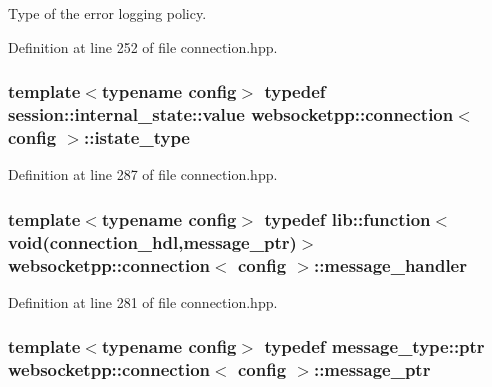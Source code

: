 Type of the error logging policy. 



Definition at line 252 of file connection.\+hpp.

\hypertarget{classwebsocketpp_1_1connection_ab22544fdc49d7f332cd1abba9fefd814}{}
\subsubsection[{istate\+\_\+type}]{\setlength{\rightskip}{0pt plus 5cm}template$<$typename config$>$ typedef {\bf session\+::internal\+\_\+state\+::value} {\bf websocketpp\+::connection}$<$ config $>$\+::{\bf istate\+\_\+type}}\label{classwebsocketpp_1_1connection_ab22544fdc49d7f332cd1abba9fefd814}


Definition at line 287 of file connection.\+hpp.

\hypertarget{classwebsocketpp_1_1connection_a0091551000546d5f5f427379d852cae9}{}
\subsubsection[{message\+\_\+handler}]{\setlength{\rightskip}{0pt plus 5cm}template$<$typename config$>$ typedef lib\+::function$<$void({\bf connection\+\_\+hdl},{\bf message\+\_\+ptr})$>$ {\bf websocketpp\+::connection}$<$ config $>$\+::{\bf message\+\_\+handler}}\label{classwebsocketpp_1_1connection_a0091551000546d5f5f427379d852cae9}


Definition at line 281 of file connection.\+hpp.

\hypertarget{classwebsocketpp_1_1connection_a3b98c091caf54540024538d2394ffb57}{}
\subsubsection[{message\+\_\+ptr}]{\setlength{\rightskip}{0pt plus 5cm}template$<$typename config$>$ typedef message\+\_\+type\+::ptr {\bf websocketpp\+::connection}$<$ config $>$\+::{\bf message\+\_\+ptr}}\label{classwebsocketpp_1_1connection_a3b98c091caf54540024538d2394ffb57}



